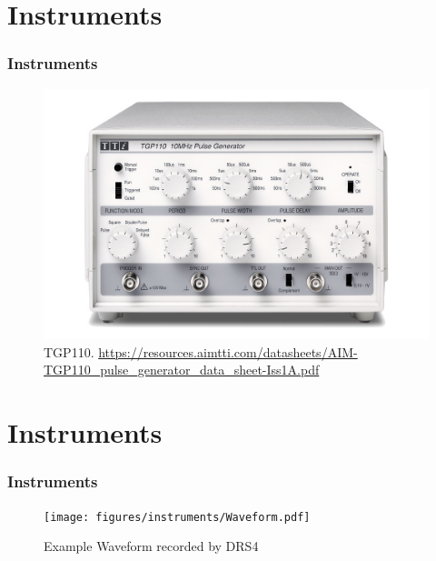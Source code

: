 \documentclass[9pt]{beamer}
\begin{document}
\section{Instruments}
\begin{frame} [fragile]
\small
	\frametitle{Instruments}
    		\begin{figure}
		 \centering
			\includegraphics[scale=0.25]{figures/instruments/AIM_TGP110_1k_0.jpg}
			\caption{TGP110. \url{https://resources.aimtti.com/datasheets/AIM-TGP110_pulse_generator_data_sheet-Iss1A.pdf}}
		\end{figure}  
\end{frame}

\section{Instruments}
\begin{frame} [fragile]
\small
	\frametitle{Instruments}
    		\begin{figure}
		 \centering
			\texttt{[image: figures/instruments/Waveform.pdf]}
			\caption{Example Waveform recorded by DRS4}
		\end{figure}  
\end{frame}

\end{document}
